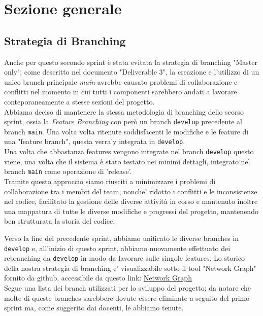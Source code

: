 \documentclass{article}
\begin{document}
\clearpage

\section{Sezione generale}

\subsection{Strategia di Branching}
Anche per questo secondo sprint è stata evitata la strategia di branching "Master only": come descritto nel documento "Deliverable 3", la creazione e l'utilizzo di un unico branch principale \textit{main} avrebbe causato problemi di collaborazione e conflitti nel momento in cui tutti i componenti sarebbero andati a lavorare conteporaneamente a stesse sezioni del progetto. \\

\noindent
Abbiamo deciso di mantenere la stessa metodologia di branching dello scorso sprint, ossia la \textit{Feature Branching} con però un branch \texttt{develop} precedente al branch \texttt{main}. Una volta volta ritenute soddisfacenti le modifiche e le feature di una "feature branch", questa verra'y integrata in \texttt{develop}.\\
Una volta che abbastanza features vengono integrate nel branch \texttt{develop} questo viene, una volta che il sistema è stato testato nei minimi dettagli, integrato nel branch \texttt{main} come operazione di 'release'.\\

\noindent
Tramite questo approccio siamo riusciti a minimizzare i problemi di  collaborazione tra i membri del team, nonche' ridotto i conflitti e le inconsistenze nel codice, facilitato la gestione delle diverse attività in corso e mantenuto inoltre una mappatura di tutte le diverse modifiche e progressi del progetto, mantenendo ben strutturata la storia del codice.

\noindent
Verso la fine del precedente sprint, abbiamo unificato le diverse branches in \texttt{develop} e, all'inizio di questo sprint, abbiamo nuovamente effettuato dei rebranching da \texttt{develop} in modo da lavorare sulle singole features.
Lo storico della nostra strategia di branching e' visualizzabile sotto il tool "Network Graph" fornito da github, accessibile da questo link:
\href{https://github.com/ELI20ZIVI/BeeLive/network}{Network Graph}\\

Segue una lista dei branch utilizzati per lo sviluppo del progetto; da notare che molte di queste branches sarebbere dovute essere eliminate a seguito del primo sprint ma, come suggerito dai docenti, le abbiamo tenute.
\end{document}
